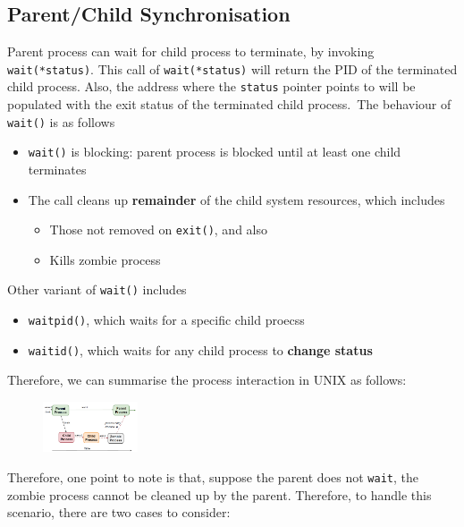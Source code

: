 \documentclass[11pt]{article}
\theoremstyle{definition}
\begin{document}
\subsection{Parent/Child Synchronisation}
Parent process can wait for child process to terminate, by invoking \texttt{wait(*status)}. This call of \texttt{wait(*status)} will return the PID of the terminated child process. Also, the address where the \texttt{status} pointer points to will be populated with the exit status of the terminated child process.\
The behaviour of \texttt{wait()} is as follows
\begin{itemize}[itemsep=0pt]
  \item \texttt{wait()} is blocking: parent process is blocked until at least one child terminates
  \item The call cleans up \textbf{remainder} of the child system resources, which includes
  \begin{itemize}[itemsep=0pt]
    \item Those not removed on \texttt{exit()}, and also
    \item Kills zombie process
  \end{itemize}
\end{itemize}
Other variant of \texttt{wait()} includes
\begin{itemize}[itemsep=0pt]
  \item \texttt{waitpid()}, which waits for a specific child proecss
  \item \texttt{waitid()}, which waits for any child process to \textbf{change status}
\end{itemize}
Therefore, we can summarise the process interaction in UNIX as follows:
\begin{figure}[h]
\centering
\includegraphics[width=0.25\textwidth]{3_1.png}
\end{figure}
Therefore, one point to note is that, suppose the parent does not \texttt{wait}, the zombie process cannot be cleaned up by the parent. Therefore, to handle this scenario, there are two cases to consider:
\end{document}
